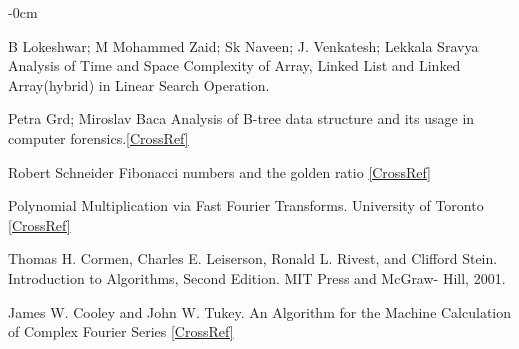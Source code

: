 \documentclass[journal,article,submit,moreauthors,algorithms]{Definitions/mdpi}
\begin{document}
\begin{adjustwidth}{-\extralength}{0cm}
\begin{thebibliography}{999}
B Lokeshwar; M Mohammed Zaid; Sk Naveen; J. Venkatesh; Lekkala Sravya Analysis of Time and Space Complexity of Array, Linked List and Linked Array(hybrid) in Linear Search Operation.

Petra Grd; Miroslav Baca Analysis of B-tree data structure and its usage in computer forensics.\href{https://www.researchgate.net/publication/210381551_Analysis_of_B-tree_data_structure_and_its_usage_in_computer_forensics}{[CrossRef]}

 Robert Schneider Fibonacci numbers and the golden ratio \href{https://www.researchgate.net/publication/310671676_Fibonacci_numbers_and_the_golden_ratio}{[CrossRef]}

 Polynomial Multiplication via Fast Fourier Transforms. University of Toronto \href{http://www.cs.toronto.edu/~denisp/csc373/docs/tutorial3-adv-writeup.pdf}{[CrossRef]}

Thomas H. Cormen, Charles E. Leiserson, Ronald
L. Rivest, and Clifford Stein. Introduction to Algorithms, Second Edition. MIT Press and McGraw-
Hill, 2001.

 James W. Cooley and John W. Tukey. An Algorithm for the Machine Calculation of Complex Fourier Series \href{https://www.ams.org/journals/mcom/1965-19-090/S0025-5718-1965-0178586-1/S0025-5718-1965-0178586-1.pdf}{[CrossRef]}
\end{thebibliography}
\PublishersNote{}
\end{adjustwidth}
\end{document}
